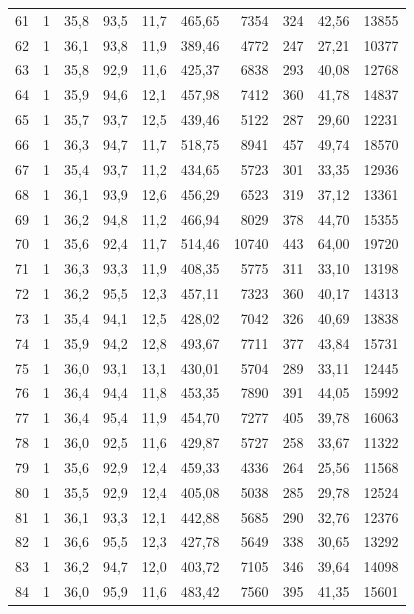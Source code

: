 \documentclass[11pt,a4paper]{article}
\begin{document}
{\begin{longtable}{r c r r r r r r r r}
61 & 1 & 35,8 & 93,5 & 11,7 & 465,65 & 7354 & 324 & 42,56 & 13855 \\
62 & 1 & 36,1 & 93,8 & 11,9 & 389,46 & 4772 & 247 & 27,21 & 10377 \\
63 & 1 & 35,8 & 92,9 & 11,6 & 425,37 & 6838 & 293 & 40,08 & 12768 \\
64 & 1 & 35,9 & 94,6 & 12,1 & 457,98 & 7412 & 360 & 41,78 & 14837 \\
65 & 1 & 35,7 & 93,7 & 12,5 & 439,46 & 5122 & 287 & 29,60 & 12231 \\
66 & 1 & 36,3 & 94,7 & 11,7 & 518,75 & 8941 & 457 & 49,74 & 18570 \\
67 & 1 & 35,4 & 93,7 & 11,2 & 434,65 & 5723 & 301 & 33,35 & 12936 \\
68 & 1 & 36,1 & 93,9 & 12,6 & 456,29 & 6523 & 319 & 37,12 & 13361 \\
69 & 1 & 36,2 & 94,8 & 11,2 & 466,94 & 8029 & 378 & 44,70 & 15355 \\
70 & 1 & 35,6 & 92,4 & 11,7 & 514,46 & 10740 & 443 & 64,00 & 19720 \\
71 & 1 & 36,3 & 93,3 & 11,9 & 408,35 & 5775 & 311 & 33,10 & 13198 \\
72 & 1 & 36,2 & 95,5 & 12,3 & 457,11 & 7323 & 360 & 40,17 & 14313 \\
73 & 1 & 35,4 & 94,1 & 12,5 & 428,02 & 7042 & 326 & 40,69 & 13838 \\
74 & 1 & 35,9 & 94,2 & 12,8 & 493,67 & 7711 & 377 & 43,84 & 15731 \\
75 & 1 & 36,0 & 93,1 & 13,1 & 430,01 & 5704 & 289 & 33,11 & 12445 \\
76 & 1 & 36,4 & 94,4 & 11,8 & 453,35 & 7890 & 391 & 44,05 & 15992 \\
77 & 1 & 36,4 & 95,4 & 11,9 & 454,70 & 7277 & 405 & 39,78 & 16063 \\
78 & 1 & 36,0 & 92,5 & 11,6 & 429,87 & 5727 & 258 & 33,67 & 11322 \\
79 & 1 & 35,6 & 92,9 & 12,4 & 459,33 & 4336 & 264 & 25,56 & 11568 \\
80 & 1 & 35,5 & 92,9 & 12,4 & 405,08 & 5038 & 285 & 29,78 & 12524 \\
81 & 1 & 36,1 & 93,3 & 12,1 & 442,88 & 5685 & 290 & 32,76 & 12376 \\
82 & 1 & 36,6 & 95,5 & 12,3 & 427,78 & 5649 & 338 & 30,65 & 13292 \\
83 & 1 & 36,2 & 94,7 & 12,0 & 403,72 & 7105 & 346 & 39,64 & 14098 \\
84 & 1 & 36,0 & 95,9 & 11,6 & 483,42 & 7560 & 395 & 41,35 & 15601 \\

\end{longtable}}
\end{document}
